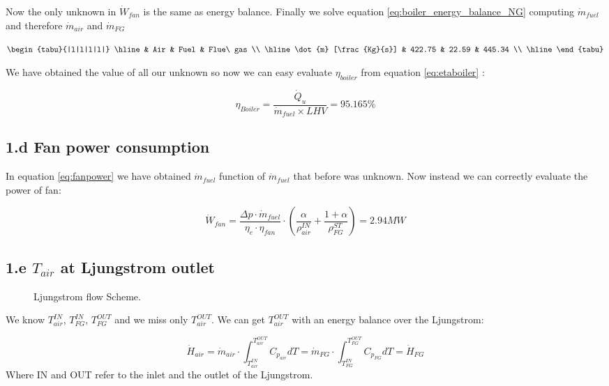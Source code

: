 \documentclass[a4paper,12pt]{article}
\begin{document}
{Now the only unknown in $\dot{W}_{fan}$ is the same as energy balance.
Finally we solve equation \ref{eq:boiler_energy_balance_NG} computing $\dot{m}_{fuel}$ and therefore $\dot{m}_{air}$ and $\dot{m}_{FG}$

\begin{center}
\tabulinesep=1.2mm
$\begin{tabu}{|l|l|l|l|}
\hline
  & Air & Fuel & Flue\ gas \\ \hline
\dot{m}  [\frac{Kg}{s}] & 422.75 & 22.59 & 445.34 \\ \hline
\end{tabu}$
\end{center}

We have obtained the value of all our unknown so now we can easy evaluate $\eta_{boiler}$ from equation \ref{eq:etaboiler} :

\begin{equation} 
\eta_{Boiler} = \frac{\dot{Q}_u}{\dot{m}_{fuel} \times LHV} = 95.165\%
\end{equation}

\subsection*{1.d Fan power consumption} 
In equation \ref{eq:fanpower} we have obtained $\dot{m}_{fuel}$ function of $\dot{m}_{fuel}$ that before was unknown. Now instead we can correctly evaluate the power of fan:

\begin{equation}
\dot{W}_{fan} = \frac{\Delta p \cdot \dot{m}_{fuel}}{\eta_e \cdot \eta_{fan}} \cdot (\frac{\alpha}{\rho^{IN}_{air}} + \frac{1+\alpha}{\rho^{ST}_{FG}}
) = 2.94 MW
\end{equation}

\subsection*{1.e $T_{air}$ at Ljungstrom outlet} 
\begin{figure}[h]
  \caption{Ljungstrom flow Scheme.}
  \centering
  
\end{figure}

We know $T_{air}^{IN}$, $T_{FG}^{IN}$, $T_{FG}^{OUT}$ and we miss only $T_{air}^{OUT}$. We can get $T_{air}^{OUT}$ with an energy balance over the Ljungstrom:

\begin{equation}
\label{eq:ljungstrom_balance}
\dot{H}_{air} 
= \dot{m}_{air} \cdot \int_{T_{air}^{IN}}^{T_{air}^{OUT}} C_{p_{air}}dT 
= \dot{m}_{FG} \cdot \int_{T_{FG}^{IN}}^{T_{FG}^{OUT}} C_{p_{FG}}dT 
= \dot{H}_{FG}
\end{equation}
Where IN and OUT refer to the inlet and the outlet of the Ljungstrom.

}
\end{document}
